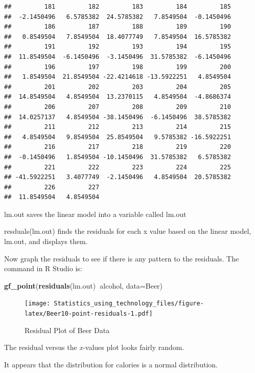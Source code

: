 \documentclass[
]{book}
\newenvironment{Shaded}{\begin{snugshade}}{\end{snugshade}}
\newcommand{\DataTypeTok}[1]{\textcolor[rgb]{0.13,0.29,0.53}{#1}}
\newcommand{\KeywordTok}[1]{\textcolor[rgb]{0.13,0.29,0.53}{\textbf{#1}}}
\newcommand{\NormalTok}[1]{#1}
\newcommand{\OperatorTok}[1]{\textcolor[rgb]{0.81,0.36,0.00}{\textbf{#1}}}
\begin{document}
\begin{verbatim}
##         181         182         183         184         185 
##  -2.1450496   6.5785382  24.5785382   7.8549504  -0.1450496 
##         186         187         188         189         190 
##   0.8549504   7.8549504  18.4077749   7.8549504  16.5785382 
##         191         192         193         194         195 
##  11.8549504  -6.1450496  -3.1450496  31.5785382  -6.1450496 
##         196         197         198         199         200 
##   1.8549504  21.8549504 -22.4214618 -13.5922251   4.8549504 
##         201         202         203         204         205 
##  14.8549504   4.8549504  13.2370115   4.8549504  -4.8686374 
##         206         207         208         209         210 
##  14.0257137   4.8549504 -38.1450496  -6.1450496  38.5785382 
##         211         212         213         214         215 
##   4.8549504   9.8549504  25.8549504   9.5785382 -16.5922251 
##         216         217         218         219         220 
##  -0.1450496   1.8549504 -10.1450496  31.5785382   6.5785382 
##         221         222         223         224         225 
## -41.5922251   3.4077749  -2.1450496   4.8549504  20.5785382 
##         226         227 
##  11.8549504   4.8549504
\end{verbatim}

lm.out saves the linear model into a variable called lm.out

resduals(lm.out) finds the residuals for each x value based on the linear model, lm.out, and displays them.

Now graph the residuals to see if there is any pattern to the residuals. The command in R Studio is:



\begin{Shaded}
\begin{Highlighting}[]
\KeywordTok{gf_point}\NormalTok{(}\KeywordTok{residuals}\NormalTok{(lm.out)}\OperatorTok{~}\NormalTok{alcohol, }\DataTypeTok{data=}\NormalTok{Beer)}
\end{Highlighting}
\end{Shaded}

\begin{figure}
\centering
\texttt{[image: Statistics\_using\_technology\_files/figure-latex/Beer10-point-residuals-1.pdf]}
\caption{\label{fig:Beer10-point-residuals}Residual Plot of Beer Data}
\end{figure}

The residual versus the \emph{x-}values plot looks fairly random.

It appears that the distribution for calories is a normal distribution.
\end{document}
